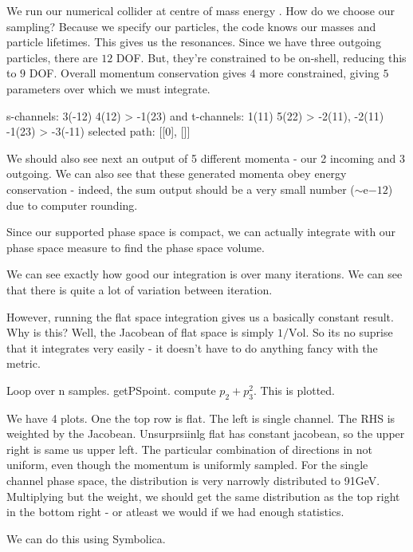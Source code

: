 We run our numerical collider at centre of mass energy . 
How do we choose our sampling? Because we specify our particles, the code knows our masses and particle lifetimes. This gives us the resonances. Since we have three outgoing particles, there are $12$ DOF. But, they're constrained to be on-shell, reducing this to $9$ DOF. Overall momentum conservation gives $4$ more constrained, giving $5$ parameters over which we must integrate.
\begin{codeenv}
    s-channels:     3(-12) 4(12) > -1(23)
and t-channels: 1(11) 5(22) > -2(11), -2(11) -1(23) > -3(-11)
selected path:  [[0], []]
\end{codeenv}
We should also see next an output of 5 different momenta - our 2 incoming and 3 outgoing. We can also see that these generated momenta obey energy conservation - indeed, the sum output should be a very small number ($\sim$e$-12$) due to computer rounding.

Since our supported phase space is compact, we can actually integrate with our phase space measure to find the phase space volume.

We can see exactly how good our integration is over many iterations. We can see that there is quite a lot of variation between iteration.

However, running the flat space integration gives us a basically constant result. Why is this? Well, the Jacobean of flat space is simply $1/\text{Vol}$. So its no suprise that it integrates very easily - it doesn't have to do anything fancy with the metric.

Loop over n samples. getPSpoint. compute $p_2+p_3 ^2$. This is plotted.

We have 4 plots. One the top row is flat. The left is single channel.
The RHS is weighted by the Jacobean. Unsurprsiinlg flat has constant jacobean, so the upper right is same us upper left. The particular combination of directions in not uniform, even though the momentum is uniformly sampled. For the single channel phase space, the distribution is very narrowly distributed to 91GeV. Multiplying but the weight, we should get the same distribution as the top right in the bottom right - or atleast we would if we had enough statistics.


We can do this using Symbolica.
